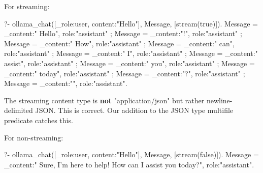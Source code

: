 For streaming:

\begin{code}
?- ollama_chat([_{role:user, content:"Hello"}], Message, [stream(true)]).
Message = _{content:" Hello", role:"assistant"} ;
Message = _{content:"!", role:"assistant"} ;
Message = _{content:" How", role:"assistant"} ;
Message = _{content:" can", role:"assistant"} ;
Message = _{content:" I", role:"assistant"} ;
Message = _{content:" assist", role:"assistant"} ;
Message = _{content:" you", role:"assistant"} ;
Message = _{content:" today", role:"assistant"} ;
Message = _{content:"?", role:"assistant"} ;
Message = _{content:"", role:"assistant"}.
\end{code}

The streaming content type is \textbf{not} "application/json" but rather
newline-delimited JSON. This is correct. Our addition to the JSON type
multifile predicate catches this.

For non-streaming:

\begin{code}
?- ollama_chat([_{role:user, content:"Hello"}], Message, [stream(false)]).
Message = _{content:" Sure, I'm here to help! How can I assist you today?", role:"assistant"}.
\end{code}

\vspace{0.7cm}

